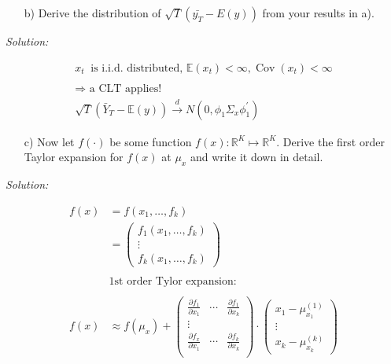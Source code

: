 \documentclass[12pt,a4paper]{article}
\newcommand{\Cov}{\operatorname{Cov}}
\begin{document}
\begin{itemize}
  \item[b)] Derive the distribution of $\sqrt{T} \left(\bar{y_T} - E(y) \right)$ from your results in a). 
\end{itemize}

\emph{Solution:}

\begin{align*}
  x_t \  \text{ is i.i.d. distributed, } \mathbb{E}(x_t)< \infty, \Cov(x_t) < \infty \\
  \\
  \Rightarrow \text{ a CLT applies!}\\
  \sqrt{T} \left( \bar{Y}_T - \mathbb{E} (y) \right) \overset{d}{\longrightarrow} N(0, \phi_1 \Sigma_x \phi_1^{'} )
\end{align*}

\begin{itemize}
  \item[c)] Now let $f(\cdot)$ be some function $f(x): \mathbb{R}^K \mapsto \mathbb{R}^K$. Derive the first order Taylor expansion for $f(x)$ at $\mu_x$ and write it down in detail.  
\end{itemize}

\emph{Solution:}

\begin{align*}
  f(x) & = f(x_1, \ldots, f_k)\\
  & = \begin{pmatrix}
    f_1 (x_1, \ldots, f_k)\\
    \vdots \\
    f_k (x_1, \ldots, f_k)
  \end{pmatrix}\\
  \\
  & \text{1st order Tylor expansion:}\\
  \\
  f(x) & \approx f (\mu_x) + \begin{pmatrix}
    \frac{\partial f_1}{\partial x_1} & \cdots & \frac{\partial f_1}{\partial x_k}\\
    \vdots \\
    \frac{\partial f_x}{\partial x_1} & \cdots & \frac{\partial f_k}{\partial x_k}\\  
    \end{pmatrix} \cdot 
    \begin{pmatrix}
      x_1 - \mu_{x_1}^{(1)}\\
      \vdots \\
      x_k - \mu_{x_k}^{(k)}
    \end{pmatrix}
\end{align*}
\end{document}
